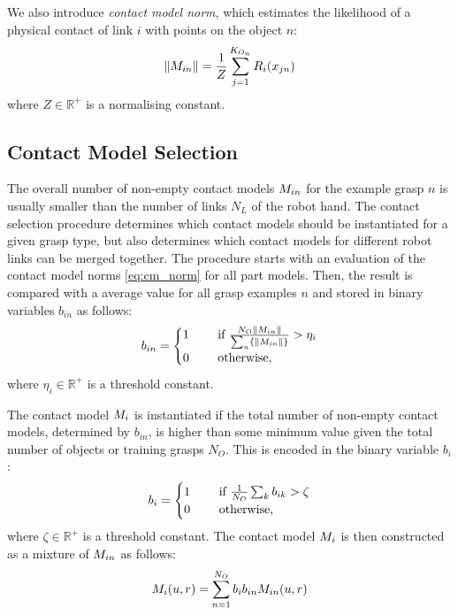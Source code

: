 We also introduce \textit{contact model norm}, which estimates the likelihood of a physical contact of link $i$ with points on the object $n$:
\begin{equation}\label{eq:cm_norm}
\|M_{in}\| = \frac 1Z \sum_{j=1}^{K_{O_n}} R_{i}(x_{jn})
\end{equation}
where $Z \in \mathbb R^+$ is a normalising constant.

\subsection{Contact Model Selection}

The overall number of non-empty contact models $M_{in}$ for the example grasp $n$ is usually smaller than the number of links $N_L$ of the robot hand. The contact selection procedure determines which contact models should be instantiated for a given grasp type, but also determines which contact models for different robot links can be merged together. The procedure starts with an evaluation of the contact model norms \eqref{eq:cm_norm} for all part models. Then, the result is compared with a average value for all grasp examples $n$ and stored in binary variables $b_{in}$ as follows:
\begin{equation}
b_{in} = \begin{cases} 1 \quad &\textnormal{ if } \frac{N_O \|M_{in}\|}{\sum_n\{\|M_{in}\|\}} > \eta_i \\
0 \quad &\textnormal{ otherwise},\end{cases}
\label{eq:cm_n_binary}
\end{equation}
where $\eta_i \in \mathbb{R}^+$ is a threshold constant.

The contact model $M_i$ is instantiated if the total number of non-empty contact models, determined by $b_{in}$, is higher than some minimum value given the total number of objects or training grasps $N_O$. This is encoded in the binary variable $b_i$:
\begin{equation}
b_i = \begin{cases} 1 \quad &\textnormal{ if } \frac{1}{N_O} \sum_k b_{ik} > \zeta\\
0 \quad &\textnormal{ otherwise},\end{cases}
\label{eq:cm_binary}
\end{equation}
where $\zeta \in \mathbb{R}^+$ is a threshold constant. The contact model $M_i$ is then constructed as a mixture of $M_{in}$ as follows:
\begin{equation}\label{eq:cm}
M_{i}(u, r) = \sum_{n=1}^{N_O} b_{i} b_{in} M_{in}(u, r)
\end{equation}

